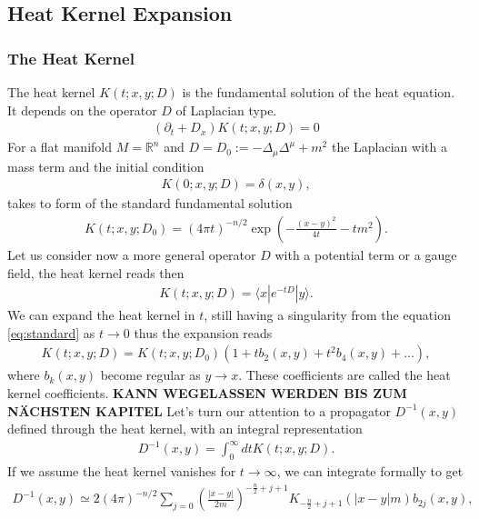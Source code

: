 \subsection{Heat Kernel Expansion}
\subsubsection{The Heat Kernel}
The heat kernel $K(t; x, y; D)$ is the fundamental solution of the heat
equation. It depends on the operator $D$ of Laplacian type.
\begin{align}
    (\partial _t + D_x)K(t;x, y;D) =0
\end{align}
For a flat manifold $M = \mathbb{R}^n$ and $D = D_0 := -\Delta_\mu\Delta^\mu +m^2$ the
Laplacian with a mass term and the initial condition
\begin{align}
    K(0;x,y;D) = \delta(x,y),
\end{align}
takes to form of the standard fundamental solution
\begin{align}\label{eq:standard}
    K(t;x,y;D_0) = (4\pi t)^{-n/2}\exp\left(-\frac{(x-y)^2}{4t}-tm^2\right).
\end{align}
Let us consider now a more general operator $D$ with a potential term or a
gauge field, the heat kernel reads then
\begin{align}
    K(t;x,y;D) = \langle x|e^{-tD}|y\rangle.
\end{align}
We can expand the heat kernel in $t$, still having a
singularity from the equation \ref{eq:standard} as $t \rightarrow 0$ thus the
expansion reads
\begin{align}
    K(t;x,y;D) = K(t;x,y;D_0)\left(1 + tb_2(x,y) + t^2b_4(x,y) + \dots
    \right),
\end{align}
where $b_k(x,y)$ become regular as $y \rightarrow x$. These coefficients are called the heat
kernel coefficients.
\newline
\textbf{KANN WEGELASSEN WERDEN BIS ZUM NÄCHSTEN KAPITEL}
Let's turn our attention to a propagator $D^{-1}(x,y)$ defined through the
heat kernel, with an integral representation
\begin{align}
    D^{-1} (x,y) = \int_0^\infty dt K(t;x,y;D).
\end{align}
If we assume the heat kernel vanishes for $t\rightarrow \infty$, we can
integrate formally to get
\begin{align}
    D^{-1}(x,y) \simeq
    2(4\pi)^{-n/2}\sum_{j=0}\left(\frac{|x-y|}{2m}\right)^{-\frac{n}{2}+j+1}
    K_{-\frac{n}{2}+j+1}(|x-y|m)b_{2j}(x,y),
\end{align}
